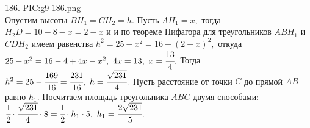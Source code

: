 186. {{PIC:g9-186.png}}\\
Опустим высоты $BH_1=CH_2=h.$ Пусть $AH_1=x,$ тогда $H_2D=10-8-x=2-x$ и и по теореме Пифагора для треугольников $ABH_1$ и $CDH_2$ имеем равенства $h^2=25-x^2=16-(2-x)^2,$ откуда $25-x^2=16-4+4x-x^2,\ 4x=13,\ x=\cfrac{13}{4}.$ Тогда $h^2=25-\cfrac{169}{16}=\cfrac{231}{16},\ h=\cfrac{\sqrt{231}}{4}.$ Пусть расстояние от точки $C$ до прямой $AB$ равно $h_1.$ Посчитаем площадь треугольника $ABC$ двумя способами: $\cfrac{1}{2}\cdot\cfrac{\sqrt{231}}{4}\cdot8=
\cfrac{1}{2}\cdot h_1\cdot5,\ h_1=\cfrac{2\sqrt{231}}{5}.$\\
